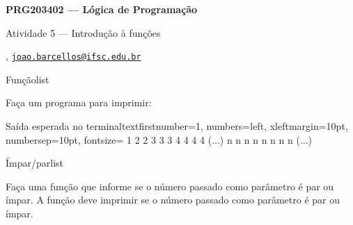 





\begin{Large}
    \textbf{PRG203402 --- Lógica de Programação}
    
    Atividade 5 --- Introdução à funções \hfill {}
\end{Large}

\vspace{1ex}
\textbf{} , \href{mailto:joao.barcellos@ifsc.edu.br}{\texttt{joao.barcellos@ifsc.edu.br}}\\
\textbf{}


\vspace{2ex}

\begin{problem}{Função}{list}

Faça um programa para imprimir:

\begin{mylisting}[enhanced]{Saída esperada no terminal}{text}{firstnumber=1, numbers=left, xleftmargin=10pt, numbersep=10pt, fontsize=\small}
1
2 2
3 3 3
4 4 4 4
(...)
n n n n n n n n (...)
\end{mylisting}

\end{problem}

\begin{problem}{Ímpar/par}{list}

Faça uma função que informe se o número passado como parâmetro é par ou ímpar. A função deve imprimir se o número passado como parâmetro é par ou ímpar.

\end{problem}

\newpage

\printbibliography


